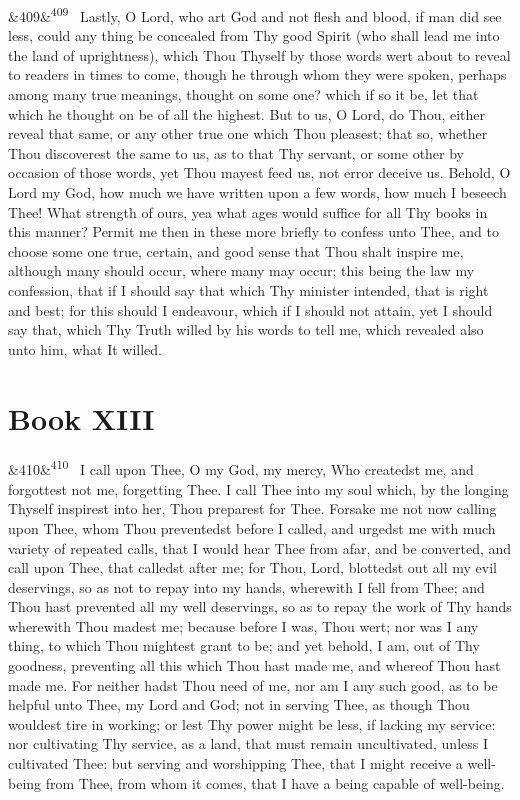 \documentclass[12pt]{article}
\newcommand{\para}[1][]{\par\noindent\ifx&#1&\else\textsuperscript{\footnotesize #1}~\fi}
\begin{document}
\para[409] Lastly, O Lord, who art God and not flesh and blood, if man did see less, could any thing be concealed from Thy good Spirit (who shall lead me into the land of uprightness), which Thou Thyself by those words wert about to reveal to readers in times to come, though he through whom they were spoken, perhaps among many true meanings, thought on some one? which if so it be, let that which he thought on be of all the highest. But to us, O Lord, do Thou, either reveal that same, or any other true one which Thou pleasest; that so, whether Thou discoverest the same to us, as to that Thy servant, or some other by occasion of those words, yet Thou mayest feed us, not error deceive us. Behold, O Lord my God, how much we have written upon a few words, how much I beseech Thee! What strength of ours, yea what ages would suffice for all Thy books in this manner? Permit me then in these more briefly to confess unto Thee, and to choose some one true, certain, and good sense that Thou shalt inspire me, although many should occur, where many may occur; this being the law my confession, that if I should say that which Thy minister intended, that is right and best; for this should I endeavour, which if I should not attain, yet I should say that, which Thy Truth willed by his words to tell me, which revealed also unto him, what It willed.

\section*{Book XIII}

\para[410] I call upon Thee, O my God, my mercy, Who createdst me, and forgottest not me, forgetting Thee. I call Thee into my soul which, by the longing Thyself inspirest into her, Thou preparest for Thee. Forsake me not now calling upon Thee, whom Thou preventedst before I called, and urgedst me with much variety of repeated calls, that I would hear Thee from afar, and be converted, and call upon Thee, that calledst after me; for Thou, Lord, blottedst out all my evil deservings, so as not to repay into my hands, wherewith I fell from Thee; and Thou hast prevented all my well deservings, so as to repay the work of Thy hands wherewith Thou madest me; because before I was, Thou wert; nor was I any thing, to which Thou mightest grant to be; and yet behold, I am, out of Thy goodness, preventing all this which Thou hast made me, and whereof Thou hast made me. For neither hadst Thou need of me, nor am I any such good, as to be helpful unto Thee, my Lord and God; not in serving Thee, as though Thou wouldest tire in working; or lest Thy power might be less, if lacking my service: nor cultivating Thy service, as a land, that must remain uncultivated, unless I cultivated Thee: but serving and worshipping Thee, that I might receive a well-being from Thee, from whom it comes, that I have a being capable of well-being.
\end{document}
